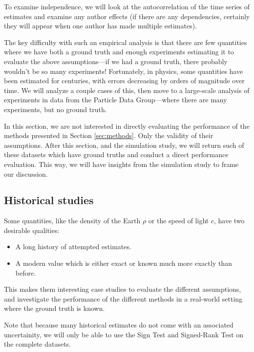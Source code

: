 \documentclass[12pt]{article}
\begin{document}
To examine independence, we will look at the autocorrelation of the time series of estimates and examine any author effects (if there are any dependencies, certainly they will appear when one author has made multiple estimates).

The key difficulty with such an empirical analysis is that there are few quantities where we have both a ground truth and enough experiments estimating it to evaluate the above assumptions---if we had a ground truth, there probably wouldn't be so many experiments! Fortunately, in physics, some quantities have been estimated for centuries, with errors decreasing by orders of magnitude over time. We will analyze a couple cases of this, then move to a large-scale analysis of experiments in data from the Particle Data Group---where there are many experiments, but no ground truth.

In this section, we are not interested in directly evaluating the performance of the methods presented in Section \ref{sec:methods}. Only the validity of their assumptions. After this section, and the simulation study, we will return such of these datasets which have ground truths and conduct a direct performance evaluation. This way, we will have insights from the simulation study to frame our discussion.

\subsection{Historical studies}\label{historical-studies}

Some quantities, like the density of the Earth $\rho$ or the speed of light $c$, have two desirable qualities:

\begin{itemize}

\item
  A long history of attempted estimates.
\item
  A modern value which is either exact or known much more exactly than before.
\end{itemize}

This makes them interesting case studies to evaluate the different assumptions, and investigate the performance of the different methods in a real-world setting where the ground truth is known.

Note that because many historical estimates do not come with an associated uncertainity, we will only be able to use the Sign Test and Signed-Rank Test on the complete datasets.
\end{document}

